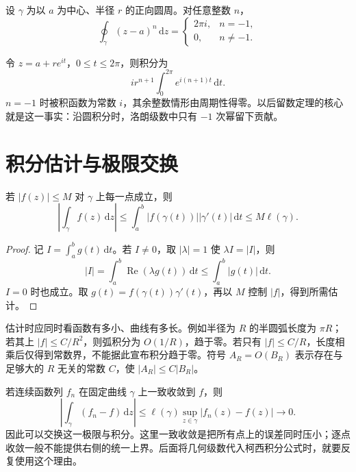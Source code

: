 \begin{example}[圆周积分的基本模型]
\label{ex:ca-circle-power}
设 $\gamma$ 为以 $a$ 为中心、半径 $r$ 的正向圆周。对任意整数 $n$，
\begin{equation}
 \oint_\gamma(z-a)^n\,\mathrm dz
 =\begin{cases}2\pi i,&n=-1,\\0,&n\ne-1.\end{cases}
 \label{eq:ca-circle-power}
\end{equation}
\end{example}
\begin{solve}
令 $z=a+re^{it}$，$0\le t\le2\pi$，则积分为
\[
 ir^{n+1}\int_0^{2\pi}e^{i(n+1)t}\,\mathrm dt.
\]
$n=-1$ 时被积函数为常数 $i$，其余整数情形由周期性得零。以后留数定理的核心就是这一事实：沿圆积分时，洛朗级数中只有 $-1$ 次幂留下贡献。
\end{solve}

\section{积分估计与极限交换}

\begin{theorem}[长乘高估计]
\label{thm:ca-ml}
若 $|f(z)|\le M$ 对 $\gamma$ 上每一点成立，则
\begin{equation}
 \left|\int_\gamma f(z)\,\mathrm dz\right|
 \le\int_a^b|f(\gamma(t))||\gamma'(t)|\,\mathrm dt
 \le M\ell(\gamma).
 \label{eq:ca-ml}
\end{equation}
\end{theorem}
\begin{proof}
记 $I=\int_a^b g(t)\,\mathrm dt$。若 $I\ne0$，取 $|\lambda|=1$ 使 $\lambda I=|I|$，则
\[
 |I|=\int_a^b\operatorname{Re}(\lambda g(t))\,\mathrm dt
 \le\int_a^b|g(t)|\,\mathrm dt.
\]
$I=0$ 时也成立。取 $g(t)=f(\gamma(t))\gamma'(t)$，再以 $M$ 控制 $|f|$，得到所需估计。
\end{proof}

估计时应同时看函数有多小、曲线有多长。例如半径为 $R$ 的半圆弧长度为 $\pi R$；若其上 $|f|\le C/R^2$，则弧积分为 $O(1/R)$，趋于零。若只有 $|f|\le C/R$，长度相乘后仅得到常数界，不能据此宣布积分趋于零。符号 $A_R=O(B_R)$ 表示存在与足够大的 $R$ 无关的常数 $C$，使 $|A_R|\le C|B_R|$。

若连续函数列 $f_n$ 在固定曲线 $\gamma$ 上一致收敛到 $f$，则
\[
 \left|\int_\gamma(f_n-f)\,\mathrm dz\right|
 \le\ell(\gamma)\sup_{z\in\gamma}|f_n(z)-f(z)|\longrightarrow0.
\]
因此可以交换这一极限与积分。这里一致收敛是把所有点上的误差同时压小；逐点收敛一般不能提供右侧的统一上界。后面将几何级数代入柯西积分公式时，就要反复使用这个理由。

